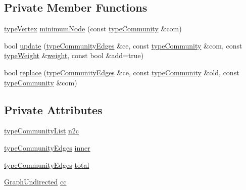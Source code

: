 \subsection*{Private Member Functions}
\begin{DoxyCompactItemize}
\item 
\hyperlink{edge_8h_a5fbd20c46956d479cb10afc9855223f6}{type\+Vertex} \hyperlink{classGraphUndirectedGroupable_a0ce165b4c68150f60ccd1977b83f3eb3}{minimum\+Node} (const \hyperlink{graphUndirectedGroupable_8h_a914da95c9ea7f14f4b7f875c36818556}{type\+Community} \&com)
\item 
bool \hyperlink{classGraphUndirectedGroupable_a7a0503e8cd7a84b7f4cd76e22ca5270a}{update} (\hyperlink{graphUndirectedGroupable_8h_abd93e760650a385346e55346b8c4bbb2}{type\+Community\+Edges} \&ce, const \hyperlink{graphUndirectedGroupable_8h_a914da95c9ea7f14f4b7f875c36818556}{type\+Community} \&com, const \hyperlink{edge_8h_a2e7ea3be891ac8b52f749ec73fee6dd2}{type\+Weight} \&\hyperlink{classGraphUndirected_ae40d431c92d8b4884c7915c44d42f356}{weight}, const bool \&add=true)
\item 
bool \hyperlink{classGraphUndirectedGroupable_ad2685678f448028f17c7627634659f7c}{replace} (\hyperlink{graphUndirectedGroupable_8h_abd93e760650a385346e55346b8c4bbb2}{type\+Community\+Edges} \&ce, const \hyperlink{graphUndirectedGroupable_8h_a914da95c9ea7f14f4b7f875c36818556}{type\+Community} \&old, const \hyperlink{graphUndirectedGroupable_8h_a914da95c9ea7f14f4b7f875c36818556}{type\+Community} \&com)
\end{DoxyCompactItemize}
\subsection*{Private Attributes}
\begin{DoxyCompactItemize}
\item 
\hyperlink{graphUndirectedGroupable_8h_a8d8ff0ef0315e7cd3b62e467487cd0e1}{type\+Community\+List} \hyperlink{classGraphUndirectedGroupable_a882c6d9efd31f3b61df38a2daccc349f}{n2c}
\item 
\hyperlink{graphUndirectedGroupable_8h_abd93e760650a385346e55346b8c4bbb2}{type\+Community\+Edges} \hyperlink{classGraphUndirectedGroupable_a5c8f0f0af49f33dbdbdcafe582a4e3ab}{inner}
\item 
\hyperlink{graphUndirectedGroupable_8h_abd93e760650a385346e55346b8c4bbb2}{type\+Community\+Edges} \hyperlink{classGraphUndirectedGroupable_a0f7cf3e9679f92d817efc208ae5710c4}{total}
\item 
\hyperlink{classGraphUndirected}{Graph\+Undirected} \hyperlink{classGraphUndirectedGroupable_aa76c119ec662942ae958b0463764a919}{cc}
\end{DoxyCompactItemize}


